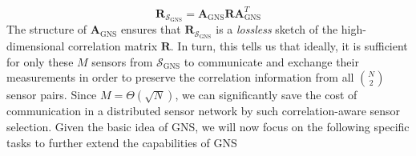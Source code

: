 \begin{equation}
\mathbf{R}_{\mathcal{S}_{\text{GNS}}} = \mathbf{A}_{\text{GNS}} \mathbf{R} \mathbf{A}^T_{\text{GNS}} 
\end{equation}
The structure of $\mathbf{A}_{\text{GNS}}$ ensures that $\mathbf{R}_{\mathcal{S}_{\text{GNS}}}$ is a {\em lossless} sketch of the high-dimensional correlation matrix $\mathbf{R}$. In turn, this tells us that ideally, it is sufficient for only these $M$ sensors from $\mathcal{S}_{\text{GNS}}$ to communicate and exchange their measurements in order to  preserve the correlation information from all $N\choose 2$ sensor pairs. Since $M = \Theta(\sqrt{N})$, we can significantly save the cost of communication in a distributed sensor network by such correlation-aware sensor selection. Given the basic idea of GNS, we will now focus on the following specific tasks to further extend the capabilities of GNS
